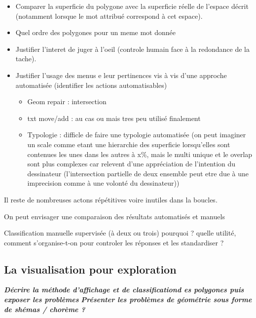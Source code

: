 \documentclass[
  12pt,
  a4paper,
]{scrbook}
\providecommand{\tightlist}{%
  \setlength{\itemsep}{0pt}\setlength{\parskip}{0pt}}\usepackage{longtable,booktabs,array}
\begin{document}
\begin{itemize}
\tightlist
\item
  Comparer la superficie du polygone avec la superficie réelle de
  l'espace décrit (notamment lorsque le mot attribué correspond à cet
  espace).
\item
  Quel ordre des polygones pour un meme mot donnée
\item
  Justifier l'interet de juger à l'oeil (controle humain face à la
  redondance de la tache).
\item
  Justifier l'usage des menus e leur pertinences vis à vis d'une
  approche automatisée (identifier les actions automatisables)

  \begin{itemize}
  \tightlist
  \item
    Geom repair : intersection
  \item
    txt move/add : au cas ou mais tres peu utilisé finalement
  \item
    Typologie : difficle de faire une typologie automatisée (on peut
    imaginer un scale comme etant une hierarchie des superficie
    lorsqu'elles sont contenues les unes dans les autres à x\%, mais le
    multi unique et le overlap sont plus complexes car relevent d'une
    appréciation de l'intention du dessinateur (l'intersection partielle
    de deux ensemble peut etre due à une imprecision comme à une volonté
    du dessinateur))
  \end{itemize}
\end{itemize}

Il reste de nombreuses actons répétitives voire inutiles dans la
boucles.

On peut envisager une comparaison des résultats automatisés et manuels

Classification manuelle supervisée (à deux ou trois) pourquoi ? quelle
utilité, comment s'organise-t-on pour controler les réponses et les
standardiser ?

\hypertarget{la-visualisation-pour-exploration}{%
\subsection{La visualisation pour
exploration}\label{la-visualisation-pour-exploration}}

\textbf{\emph{Décrire la méthode d'affichage et de classificationd es
polygones puis exposer les problèmes}} \textbf{\emph{Présenter les
problèmes de géométrie sous forme de shémas / chorème ?}}
\end{document}
